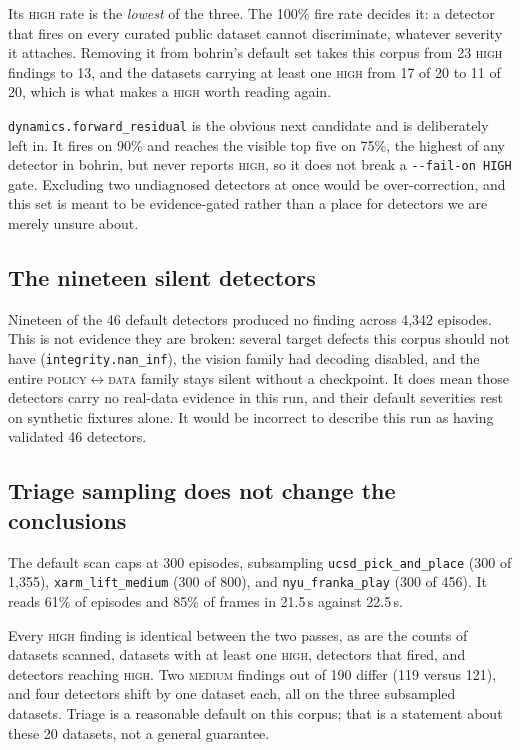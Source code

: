 \documentclass[10pt,a4paper]{article}
\newcommand{\dtr}[1]{\texttt{\small #1}}
\begin{document}
Its \textsc{high} rate is the \emph{lowest} of the three. The 100\% fire rate decides it: a
detector that fires on every curated public dataset cannot discriminate, whatever severity it
attaches. Removing it from bohrin's default set takes this corpus from 23 \textsc{high}
findings to 13, and the datasets carrying at least one \textsc{high} from 17 of 20 to 11 of
20, which is what makes a \textsc{high} worth reading again.

\dtr{dynamics.forward\_residual} is the obvious next candidate and is deliberately left in.
It fires on 90\% and reaches the visible top five on 75\%, the highest of any detector in
bohrin, but never reports \textsc{high}, so it does not break a \texttt{-{}-fail-on HIGH}
gate. Excluding two undiagnosed detectors at once would be over-correction, and this set is
meant to be evidence-gated rather than a place for detectors we are merely unsure about.

\subsection{The nineteen silent detectors}

Nineteen of the 46 default detectors produced no finding across 4{,}342 episodes. This is
not evidence they are broken: several target defects this corpus should not have
(\dtr{integrity.nan\_inf}), the vision family had decoding disabled, and the entire
\textsc{policy}$\leftrightarrow$\textsc{data} family stays silent without a checkpoint. It
does mean those detectors carry no real-data evidence in this run, and their default
severities rest on synthetic fixtures alone. It would be incorrect to describe this run as
having validated 46 detectors.

\subsection{Triage sampling does not change the conclusions}
\label{sec:triage}

The default scan caps at 300 episodes, subsampling \dtr{ucsd\_pick\_and\_place} (300 of
1{,}355), \dtr{xarm\_lift\_medium} (300 of 800), and \dtr{nyu\_franka\_play} (300 of 456).
It reads 61\% of episodes and 85\% of frames in 21.5\,s against 22.5\,s.

Every \textsc{high} finding is identical between the two passes, as are the counts of
datasets scanned, datasets with at least one \textsc{high}, detectors that fired, and
detectors reaching \textsc{high}. Two \textsc{medium} findings out of 190 differ
(119 versus 121), and four detectors shift by one dataset each, all on the three subsampled
datasets. Triage is a reasonable default on this corpus; that is a statement about these 20
datasets, not a general guarantee.
\end{document}
